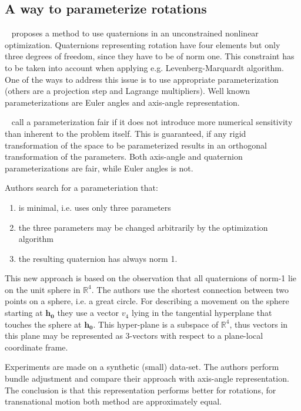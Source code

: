 \documentclass[10pt]{article}         %
\begin{document}
\subsection{A way to parameterize rotations}
~\cite{schmidt2001using} proposes a method to use quaternions in an
unconstrained nonlinear optimization.  Quaternions representing
rotation have four elements but only three degrees of freedom, since
they have to be of norm one.  This constraint has to be taken into
account when applying e.g. Levenberg-Marquardt algorithm.  One of the
ways to address this issue is to use appropriate parameterization
(others are a projection step and Lagrange multipliers). Well known
parameterizations are Euler angles and axis-angle representation.

~\cite{hornegger1999representation} call a parameterization fair if it
does not introduce more numerical sensitivity than inherent to the
problem itself.  This is guaranteed, if any rigid transformation of
the space to be parameterized results in an orthogonal transformation
of the parameters.  Both axis-angle and quaternion parameterizations
are fair, while Euler angles is not.

Authors search for a parameteriation that:
\begin{enumerate}
\item is minimal, i.e. uses only three parameters
\item the three parameters may be changed arbitrarily by the optimization algorithm
\item the resulting quaternion has always norm 1.
\end{enumerate}

This new approach is based on the observation that all quaternions of
norm-1 lie on the unit sphere in $\mathbb{R}^4$.  The authors use the
shortest connection between two points on a sphere, i.e. a great
circle.  For describing a movement on the sphere starting at
$\mathbf{h_0}$ they use a vector $v_4$ lying in the tangential
hyperplane that touches the sphere at $\mathbf{h_0}$. This hyper-plane
is a subspace of $\mathbb{R}^4$, thus vectors in this plane may be
represented as 3-vectors with respect to a plane-local coordinate
frame.

Experiments are made on a synthetic (small) data-set.  The authors
perform bundle adjustment and compare their approach with axis-angle
representation.  The conclusion is that this representation performs
better for rotations, for transnational motion both method are
approximately equal.

{}

\end{document}
